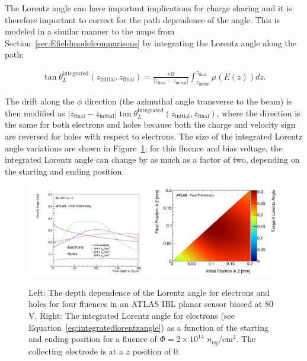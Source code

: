 The Lorentz angle can have important implications for charge sharing and it is therefore important to correct for the path dependence of the angle.  This is modeled in a similar manner to the maps from Section~\ref{sec:Efieldmodelcomparisons} by integrating the Lorentz angle along the path:

\begin{align}
\label{eq:integratedlorentzangle}
\tan\theta_L^\text{integrated}(z_\text{initial},z_\text{final})=\frac{rB}{|z_\text{final}-z_\text{initial}|}\int_{z_\text{initial}}^{z_\text{final}}\mu(E(z)) dz.
\end{align}

The drift along the $\phi$ direction (the azimuthal angle transverse to the beam) is then modified as $|z_\text{final}-z_\text{initial}|\tan\theta_L^\text{integrated}(z_\text{initial},z_\text{final})$, where the direction is the same for both electrons and holes because both the charge and velocity sign are reversed for holes with respect to electrons. The size of the integrated Lorentz angle variations are shown in Figure~\ref{fig:lorentzangle:Run2}; for this fluence and bias voltage, the integrated Lorentz angle can change by as much as a factor of two, depending on the starting and ending position.  

\begin{figure}[htpb!]
\centering
\includegraphics[width=0.49\textwidth]{new2Angle_0fluence80V.pdf}
\includegraphics[width=0.49\textwidth]{newRun2.pdf}
\caption{Left: The depth dependence of the Lorentz angle for electrons and holes for four fluences in an ATLAS IBL planar sensor biased at 80 V.  Right: The integrated Lorentz angle for electrons (see Equation~\ref{eq:integratedlorentzangle}) as a function of the starting and ending position for a fluence of $\Phi=2\times10^{14}$ $n_\text{eq}/\text{cm}^2$.  The collecting electrode is at a $z$ position of $0$.}
\label{fig:lorentzangle:Run2}
\end{figure}


